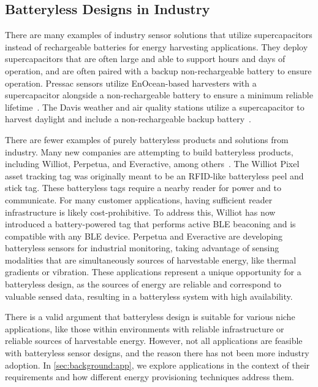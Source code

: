 \subsection{Batteryless Designs in Industry}
There are many examples of industry sensor solutions that utilize supercapacitors instead of rechargeable batteries for energy harvesting applications. 
They deploy supercapacitors that are often large and able to support hours and days of operation, and are often paired with a backup non-rechargeable battery to ensure operation.
Pressac sensors utilize EnOcean-based harvesters with a supercapacitor alongside a non-rechargeable battery to ensure a minimum reliable lifetime~\cite{pressac,enocean}.
The Davis weather and air quality stations utilize a supercapacitor to harvest daylight and include a non-rechargeable backup battery~\cite{davis_weather}.

There are fewer examples of purely batteryless products and solutions from industry. 
Many new companies are attempting to build batteryless products, including Williot, Perpetua, and Everactive, among others~\cite{williotpixel,perpetua,everactive}.
The Williot Pixel asset tracking tag was originally meant to be an RFID-like batteryless peel and stick tag. These batteryless tags require a nearby reader for power and to communicate. 
For many customer applications, having sufficient reader infrastructure is likely cost-prohibitive.
To address this, Williot has now introduced a battery-powered tag that performs active BLE beaconing and is compatible with any BLE device.
Perpetua and Everactive are developing batteryless sensors for industrial monitoring, taking advantage of sensing modalities that are simultaneously sources of harvestable energy, like thermal gradients or vibration.
These applications represent a unique opportunity for a batteryless design, as the sources of energy are reliable and correspond to valuable sensed data, resulting in a batteryless system with high availability.

There is a valid argument that batteryless design is suitable for various niche applications, like those within environments with reliable infrastructure or reliable sources of harvestable energy. 
However, not all applications are feasible with batteryless sensor designs, and the reason there has not been more industry adoption. 
In \cref{sec:background:app}, we explore applications in the context of their requirements and how different energy provisioning techniques address them.


